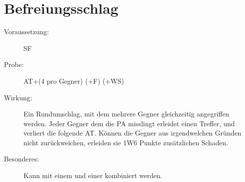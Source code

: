 \section{Befreiungsschlag}
\label{aktion.befreiungsschlag}
\begin{description}
    \item[Voraussetzung:]
        SF 
    \item[Probe:]
        AT+(4 pro Gegner) (+F) (+WS)
    \item[Wirkung:]
        Ein Rundumschlag, mit dem mehrere Gegner gleichzeitig angegriffen werden.
        Jeder Gegner dem die PA misslingt erleidet einen Treffer, und verliert die folgende AT.
        Können die Gegner aus irgendwelchen Gründen nicht zurückweichen, erleiden sie 1W6 Punkte zusätzlichen Schaden.
    \item[Besonderes:]
        Kann mit einem  und einer  kombiniert werden.
\end{description}
